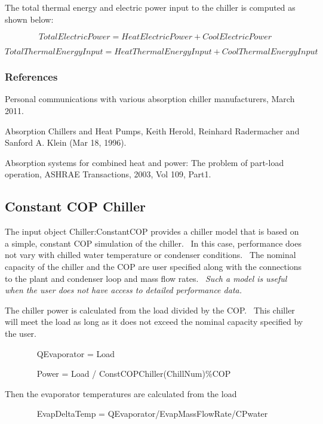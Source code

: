 The total thermal energy and electric power input to the chiller is computed as shown below:

\begin{equation}
TotalElectricPower = HeatElectricPower + CoolElectricPower
\end{equation}

\begin{equation}
TotalThermalEnergyInput = HeatThermalEnergyInput + CoolThermalEnergyInput
\end{equation}

\subsubsection{References}\label{references-009}

Personal communications with various absorption chiller manufacturers, March 2011.

Absorption Chillers and Heat Pumps, Keith Herold, Reinhard Radermacher and Sanford A. Klein (Mar 18, 1996).

Absorption systems for combined heat and power: The problem of part-load operation, ASHRAE Transactions, 2003, Vol 109, Part1.

\subsection{Constant COP Chiller}\label{constant-cop-chiller}

The input object Chiller:ConstantCOP provides a chiller model that is based on a simple, constant COP simulation of the chiller.~ In this case, performance does not vary with chilled water temperature or condenser conditions.~ The nominal capacity of the chiller and the COP are user specified along with the connections to the plant and condenser loop and mass flow rates.~ \emph{Such a model is useful when the user does not have access to detailed performance data.}

The chiller power is calculated from the load divided by the COP.~ This chiller will meet the load as long as it does not exceed the nominal capacity specified by the user.

~~~~~~~ QEvaporator = Load

~~~~~~~ Power = Load / ConstCOPChiller(ChillNum)\%COP

Then the evaporator temperatures are calculated from the load

~~~~~~~ EvapDeltaTemp = QEvaporator/EvapMassFlowRate/CPwater

